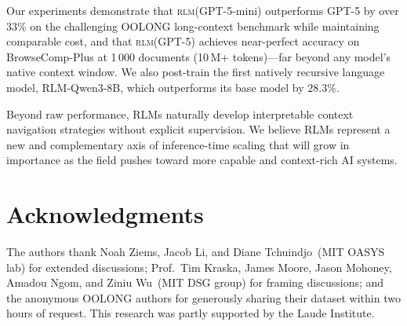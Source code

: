 \documentclass[journal, 10pt, letterpaper]{IEEEtran}
\newcommand{\RLM}[1]{\textsc{rlm}(#1)}
\begin{document}
Our experiments demonstrate that \RLM{GPT-5-mini} outperforms GPT-5 by over
$33\%$ on the challenging OOLONG long-context benchmark while maintaining
comparable cost, and that \RLM{GPT-5} achieves near-perfect accuracy on
BrowseComp-Plus at 1\,000 documents (10\,M+ tokens)---far beyond any model's
native context window.  We also post-train the first natively recursive
language model, RLM-Qwen3-8B, which outperforms its base model by $28.3\%$.

Beyond raw performance, RLMs naturally develop interpretable context navigation
strategies without explicit supervision.  We believe RLMs represent a new and
complementary axis of inference-time scaling that will grow in importance as
the field pushes toward more capable and context-rich AI systems.

\section*{Acknowledgments}

The authors thank Noah Ziems, Jacob Li, and Diane Tchuindjo~(MIT OASYS lab)
for extended discussions; Prof.\ Tim Kraska, James Moore, Jason Mohoney,
Amadou Ngom, and Ziniu Wu~(MIT DSG group) for framing discussions; and the
anonymous OOLONG authors for generously sharing their dataset within two hours
of request.  This research was partly supported by the Laude Institute.
\end{document}
